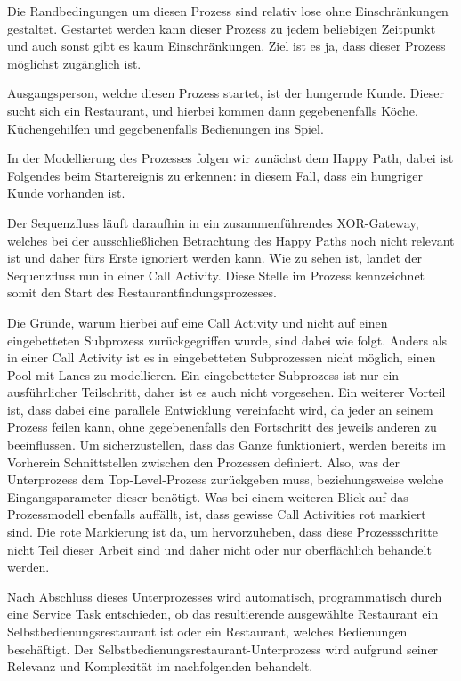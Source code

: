 Die Randbedingungen um diesen Prozess sind relativ lose ohne Einschränkungen gestaltet. Gestartet werden kann dieser Prozess zu jedem beliebigen Zeitpunkt und auch sonst gibt es kaum Einschränkungen. Ziel ist es ja, dass dieser Prozess möglichst zugänglich ist.

Ausgangsperson, welche diesen Prozess startet, ist der hungernde Kunde. Dieser sucht sich ein Restaurant, und hierbei kommen dann gegebenenfalls Köche, Küchengehilfen und gegebenenfalls Bedienungen ins Spiel. 

\clearpage
{}

In der Modellierung des Prozesses folgen wir zunächst dem Happy Path, dabei ist Folgendes beim Startereignis zu erkennen: in diesem Fall, dass ein hungriger Kunde vorhanden ist.

Der Sequenzfluss läuft daraufhin in ein zusammenführendes XOR-Gateway, welches bei der ausschließlichen Betrachtung des Happy Paths noch nicht relevant ist und daher fürs Erste ignoriert werden kann. Wie zu sehen ist, landet der Sequenzfluss nun in einer Call Activity. Diese Stelle im Prozess kennzeichnet somit den Start des Restaurantfindungsprozesses.

Die Gründe, warum hierbei auf eine Call Activity und nicht auf einen eingebetteten Subprozess zurückgegriffen wurde, sind dabei wie folgt. Anders als in einer Call Activity ist es in eingebetteten Subprozessen nicht möglich, einen Pool mit Lanes zu modellieren. Ein eingebetteter Subprozess ist nur ein ausführlicher Teilschritt, daher ist es auch nicht vorgesehen. Ein weiterer Vorteil ist, dass dabei eine parallele Entwicklung vereinfacht wird, da jeder an seinem Prozess feilen kann, ohne gegebenenfalls den Fortschritt des jeweils anderen zu beeinflussen. Um sicherzustellen, dass das Ganze funktioniert, werden bereits im Vorherein Schnittstellen zwischen den Prozessen definiert. Also, was der Unterprozess dem Top-Level-Prozess zurückgeben muss, beziehungsweise welche Eingangsparameter dieser benötigt. Was bei einem weiteren Blick auf das Prozessmodell ebenfalls auffällt, ist, dass gewisse Call Activities rot markiert sind. Die rote Markierung ist da, um hervorzuheben, dass diese Prozessschritte nicht Teil dieser Arbeit sind und daher nicht oder nur oberflächlich behandelt werden.

Nach Abschluss dieses Unterprozesses wird automatisch, programmatisch durch eine Service Task entschieden, ob das resultierende ausgewählte Restaurant ein Selbstbedienungsrestaurant ist oder ein Restaurant, welches Bedienungen beschäftigt. Der Selbstbedienungsrestaurant-Unterprozess wird aufgrund seiner Relevanz und Komplexität im nachfolgenden  behandelt.


